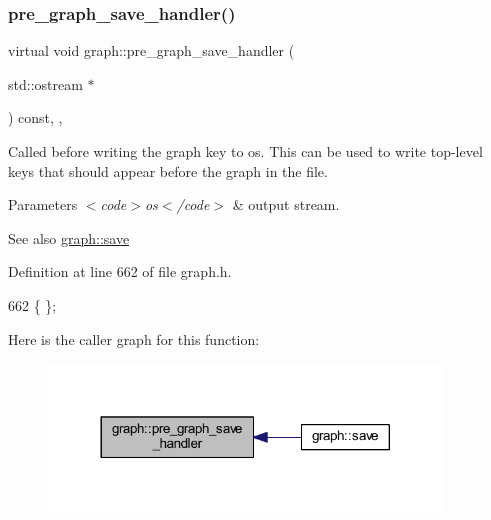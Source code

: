 \subsubsection{\texorpdfstring{pre\+\_\+graph\+\_\+save\+\_\+handler()}{pre\_graph\_save\_handler()}}
{\footnotesize\ttfamily virtual void graph\+::pre\+\_\+graph\+\_\+save\+\_\+handler (\begin{DoxyParamCaption}\item[{std\+::ostream $\ast$}]{ }\end{DoxyParamCaption}) const\hspace{0.3cm}{\ttfamily [inline]}, {\ttfamily [virtual]}, {\ttfamily [inherited]}}

Called before writing the graph key to {\ttfamily os}. This can be used to write top-\/level keys that should appear before the graph in the file.


\begin{DoxyParams}{Parameters}
{\em $<$code$>$os$<$/code$>$} & output stream. \\
\hline
\end{DoxyParams}
\begin{DoxySeeAlso}{See also}
\mbox{\hyperlink{classgraph_a7bd0712a528249d1585085a64ac3e661}{graph\+::save}} 
\end{DoxySeeAlso}


Definition at line 662 of file graph.\+h.


\begin{DoxyCode}
662 \{ \};
\end{DoxyCode}
Here is the caller graph for this function\+:
\nopagebreak
\begin{figure}[H]
\begin{center}
\leavevmode
\includegraphics[width=296pt]{classgraph_ab257e02f6fd04fef244032a3a15bec9f_icgraph}
\end{center}
\end{figure}
\mbox{\label{classgraph_aa33201befa6ad7433becd7424d6de55b}} 
